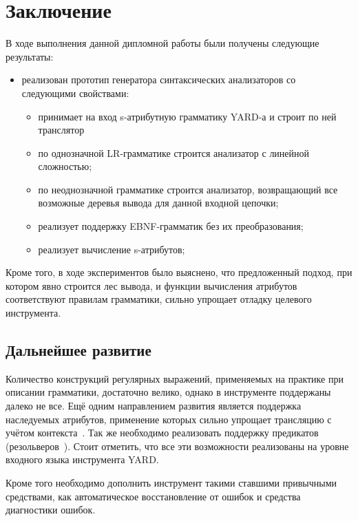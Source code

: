 \section{Заключение}

В ходе выполнения данной дипломной работы были получены следующие результаты:
\begin{itemize}
	
	
	\item реализован прототип генератора синтаксических анализаторов со следующими свойствами:
		\begin{itemize}
		  \item принимает на вход s-атрибутную грамматику YARD-а и строит по ней транслятор
		  
			\item по однозначной LR-грамматике строится анализатор с линейной сложностью;
			
			\item по неоднозначной грамматике строится анализатор, возвращающий все возможные деревья вывода для данной входной цепочки;
			
			\item реализует поддержку EBNF-грамматик без их преобразования;
			
			\item реализует вычисление s-атрибутов; 
		
		\end{itemize}
		
\end{itemize}

Кроме того, в ходе экспериментов было выяснено, что предложенный подход, при котором явно строится лес вывода, и функции вычисления атрибутов соответствуют правилам грамматики, сильно упрощает отладку целевого инструмента.

\subsection{Дальнейшее развитие}

   Количество конструкций регулярных выражений, применяемых на практике при описании грамматики, достаточно велико, однако в инструменте поддержаны далеко не все. Ещё одним направлением развития является поддержка наследуемых атрибутов, применение которых сильно упрощает трансляцию с учётом контекста~\cite{Diploma}. Так же необходимо реализовать поддержку предикатов (резольверов~\cite{MartinenkoSUT}). Стоит отметить, что все эти возможности реализованы на уровне входного языка инструмента YARD.

Кроме того необходимо дополнить инструмент такими ставшими привычными средствами, как автоматическое восстановление от ошибок и средства диагностики ошибок.
